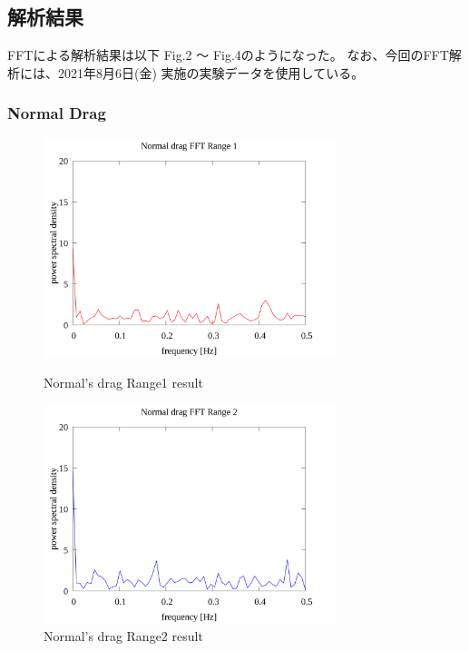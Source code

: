 \documentclass[twocolumn,a4j]{jsarticle}
\begin{document}
\subsection{解析結果}
FFTによる解析結果は以下 Fig.2 ～ Fig.4のようになった。
なお、今回のFFT解析には、2021年8月6日(金) 実施の実験データを使用している。\\
\subsubsection{Normal Drag}
\begin{figure}[htbp]
    \footnotesize
    \begin{center}
        \includegraphics[width=85mm]{../images/Normal_drag_06.png}
        \caption{Normal's drag Range1 result}
        \includegraphics[width=85mm]{../images/Normal_drag_07.png}
        \caption{Normal's drag Range2 result}
    \end{center}
\end{figure}
\newpage
\end{document}
